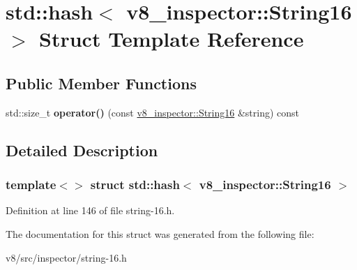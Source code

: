 \hypertarget{structstd_1_1hash_3_01v8__inspector_1_1String16_01_4}{}\section{std\+:\+:hash$<$ v8\+\_\+inspector\+:\+:String16 $>$ Struct Template Reference}
\label{structstd_1_1hash_3_01v8__inspector_1_1String16_01_4}
\subsection*{Public Member Functions}
\begin{DoxyCompactItemize}
\item 
\mbox{\label{structstd_1_1hash_3_01v8__inspector_1_1String16_01_4_a8a06b51103e96e7459186c737d8a4b95}} 
std\+::size\+\_\+t {\bfseries operator()} (const \mbox{\hyperlink{classv8__inspector_1_1String16}{v8\+\_\+inspector\+::\+String16}} \&string) const
\end{DoxyCompactItemize}


\subsection{Detailed Description}
\subsubsection*{template$<$$>$\newline
struct std\+::hash$<$ v8\+\_\+inspector\+::\+String16 $>$}



Definition at line 146 of file string-\/16.\+h.



The documentation for this struct was generated from the following file\+:\begin{DoxyCompactItemize}
\item 
v8/src/inspector/string-\/16.\+h\end{DoxyCompactItemize}
